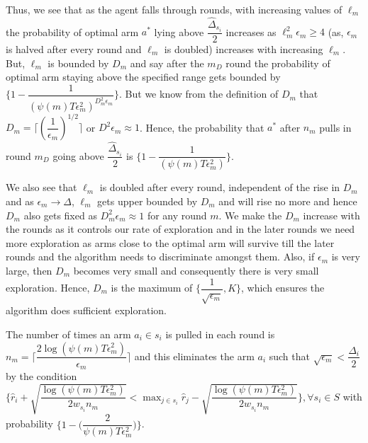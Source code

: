 \begin{remark}
	Thus, we see that as the agent falls through rounds, with increasing values of $\ell_{m}$ the probability of optimal arm $a^{*}$ lying above $\dfrac{\hat{\Delta}_{s_{i}}}{2}$ increases as $\ell_{m}^{2}\epsilon_{m}\geq 4$ (as, $\epsilon_{m}$ is halved after every round and $\ell_{m}$ is doubled) increases with increasing $\ell_{m}$. But, $\ell_{m}$ is bounded by $D_{m}$ and say after the $m_{D}$ round the probability of optimal arm staying above the specified range gets bounded by $\bigg\lbrace 1- \dfrac{1}{(\psi(m)T\epsilon_{m}^{2})^{D_{m}^{2}\epsilon_{m}}} \bigg\rbrace$. But we know from the definition of $D_{m}$ that $ D_{m}=\bigg\lceil(\dfrac{1}{\epsilon_{m}})^{1/2}\bigg\rceil$ or $D^{2}\epsilon_{m}\approx 1$. Hence, the probability that   $a^{*}$ after $n_{m}$ pulls in round $m_{D}$ going above $\dfrac{\hat{\Delta}_{s_{i}}}{2}$ is $\bigg\lbrace 1- \dfrac{1}{(\psi(m)T\epsilon_{m}^{2}) }\bigg\rbrace$.

	We also see that $\ell_{m}$ is doubled after every round, independent of the rise in $D_{m}$ and as $\epsilon_{m}\rightarrow \Delta $, $\ell_{m}$ gets upper bounded by $D_{m}$ and will rise no more and hence $D_{m}$ also gets fixed as $D_{m}^{2}\epsilon_{m}\approx 1$ for any round $m$. We make the $D_{m}$ increase with the rounds as it controls our rate of exploration and in the later rounds we need more exploration as arms close to the optimal arm will survive till the later rounds and the algorithm needs to discriminate amongst them.  Also, if $\epsilon_{m}$ is very large, then $D_{m}$ becomes very small and consequently there is very small exploration. Hence, $D_{m}$ is the maximum of $\lbrace \dfrac{1}{\sqrt{\epsilon_{m}}}, K \rbrace$, which ensures the algorithm does sufficient exploration. 
\end{remark}



\begin{proposition}
The number of times an arm $a_{i}\in s_{i}$ is pulled in each round is $n_{m}=\bigg\lceil\dfrac{2\log{(\psi(m)T\epsilon_{m}^{2})}}{\epsilon_{m}}\bigg\rceil$ and this eliminates the arm $a_{i}$ such that $\sqrt{\epsilon_{m}}<\dfrac{\Delta_{i}}{2}$ by the condition $\bigg\lbrace\hat{r}_{i} + \sqrt{\dfrac{\log (\psi(m)T\epsilon_{m}^{2})}{2w_{s_{i}} n_{m}}} < \max_{j\in s_{i}}\hat{r}_{j} - \sqrt{\dfrac{\log (\psi(m)T\epsilon_{m}^{2})}{2w_{s_{i}} n_{m}}} \bigg\rbrace, \forall s_{i}\in S$ with probability $\bigg\lbrace 1-\bigg(\dfrac{2}{\psi(m)T\epsilon_{m}^{2}}\bigg)\bigg\rbrace$. 
\end{proposition}

